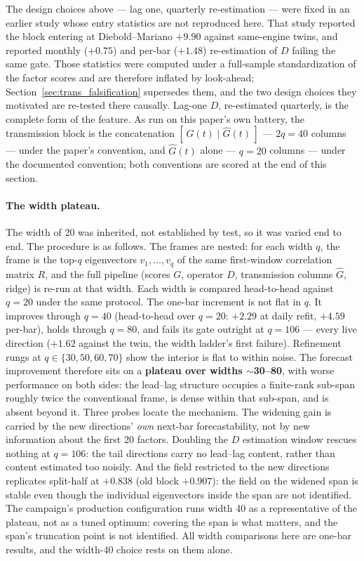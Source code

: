The design choices above --- lag one, quarterly re-estimation --- were
fixed in an earlier study whose entry statistics are not reproduced here.
That study reported the block entering at Diebold--Mariano $+9.90$ against
same-engine twins, and reported monthly ($+0.75$) and per-bar ($+1.48$)
re-estimation of $D$ failing the same gate. Those statistics were computed
under a full-sample standardization of the factor scores and are therefore
inflated by look-ahead; Section~\ref{sec:trans_falsification} supersedes
them, and the two design choices they motivated are re-tested there
causally. Lag-one $D$, re-estimated quarterly, is the complete form of the
feature. As
run on this paper's own battery, the transmission block is the concatenation
$[\, G(t) \mid \hat G(t) \,]$ --- $2q = 40$ columns --- under the paper's
convention, and $\hat G(t)$ alone --- $q = 20$ columns --- under the
documented convention; both conventions are scored at the end of this
section.

\paragraph{The width plateau.}
The width of 20 was inherited, not established by test, so it was varied end
to end. The procedure is as follows. The frames are nested: for each width
$q$, the frame is the top-$q$ eigenvectors $v_1, \dots, v_q$ of the same
first-window correlation matrix $R$, and the full pipeline (scores $G$,
operator $D$, transmission columns $\hat G$, ridge) is re-run at that width.
Each width is compared head-to-head against $q = 20$ under the same protocol.
The one-bar increment is not flat in $q$. It improves through $q = 40$
(head-to-head over $q = 20$: $+2.29$ at daily refit, $+4.59$ per-bar), holds
through $q = 80$, and fails its gate outright at $q = 106$ --- every live
direction ($+1.62$ against the twin, the width ladder's first failure).
Refinement rungs at $q \in \{30, 50, 60, 70\}$ show the interior is flat to
within noise. The forecast improvement therefore sits on a \textbf{plateau
over widths $\sim$30--80}, with worse performance on both sides: the
lead--lag structure occupies a finite-rank sub-span roughly twice the
conventional frame, is dense within that sub-span, and is absent beyond it.
Three probes locate the mechanism. The widening gain is carried by the new
directions' \emph{own} next-bar forecastability, not by new information about
the first 20 factors. Doubling the $D$ estimation window rescues nothing at
$q = 106$: the tail directions carry no lead--lag content, rather than
content estimated too noisily. And the field restricted to the new directions
replicates split-half at $+0.838$ (old block $+0.907$): the field on the
widened span is stable even though the individual eigenvectors inside the
span are not identified. The campaign's production configuration runs width
40 as a representative of the plateau, not as a tuned optimum: covering the
span is what matters, and the span's truncation point is not identified. All
width comparisons here are one-bar results, and the width-40 choice rests on
them alone.

